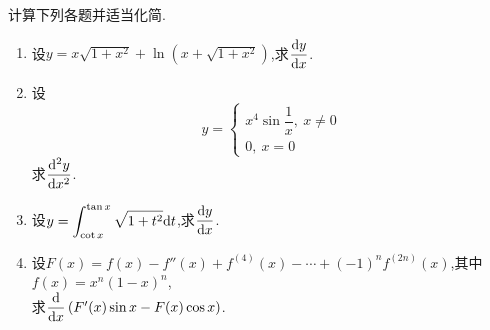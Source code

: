 \documentclass{ctexart}
\begin{document}
\begin{problem}[2.(20\songti{分})]
    计算下列各题并适当化简.
    \begin{enumerate}[label=\textbf{(\arabic*)}]
        \item 设$y=x\sqrt{1+x^2}+\ln{\left(x+\sqrt{1+x^2}\right)}$,求$\dfrac{\mathrm{d} y}{\mathrm{d} x}$.
        \item 设
            $$y=\left\{
                \begin{array}{l}
                    x^4\sin{\dfrac{1}{x}},\ x\neq 0 \\
                    0,\ x=0
                \end{array}
                \right.$$
            求$\dfrac{\mathrm{d}^2 y}{\mathrm{d} x^2}$.
        \item 设$\displaystyle y=\int_{\cot x}^{\tan x}\sqrt{1+t^2}\mathrm{d} t$,求$\dfrac{\mathrm{d} y}{\mathrm{d} x}$.
        \item 设$F(x)=f(x)-f''(x)+f^{(4)}(x)-\cdots+(-1)^{n}f^{(2n)}(x)$,其中$f(x)=x^n(1-x)^n$,
            \\求$\dfrac{\mathrm{d}}{\mathrm{d} x}\left(F'(x)\sin x-F(x)\cos x\right)$.
    \end{enumerate}
\end{problem}
\end{document}
